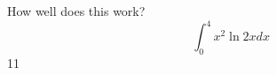 \documentclass{article}
\begin{document}
How well does this work?
$$\int_0^4 x^2 \ln{2x}dx$$
11
\end{document}
